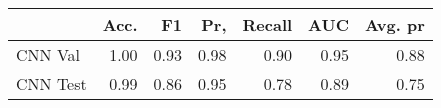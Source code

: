 \begin{tabular}{lrrrrrr}
\toprule
{} &  Acc. &    F1 &   Pr, &  Recall &   AUC &  Avg. pr \\
\midrule
CNN Val  &  1.00 &  0.93 &  0.98 &    0.90 &  0.95 &     0.88 \\
CNN Test &  0.99 &  0.86 &  0.95 &    0.78 &  0.89 &     0.75 \\
\bottomrule
\end{tabular}

